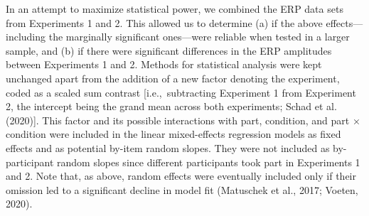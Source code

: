 \documentclass[
  english,
  man,12pt,twoside]{apa7}
\begin{document}
In an attempt to maximize statistical power, we combined the ERP data sets from Experiments 1 and 2. This allowed us to determine (a) if the above effects---including the marginally significant ones---were reliable when tested in a larger sample, and (b) if there were significant differences in the ERP amplitudes between Experiments 1 and 2. Methods for statistical analysis were kept unchanged apart from the addition of a new factor denoting the experiment, coded as a scaled sum contrast {[}i.e.,~subtracting Experiment 1 from Experiment 2, the intercept being the grand mean across both experiments; Schad et al. (2020){]}. This factor and its possible interactions with part, condition, and part × condition were included in the linear mixed-effects regression models as fixed effects and as potential by-item random slopes. They were not included as by-participant random slopes since different participants took part in Experiments 1 and 2. Note that, as above, random effects were eventually included only if their omission led to a significant decline in model fit (Matuschek et al., 2017; Voeten, 2020).
\end{document}
